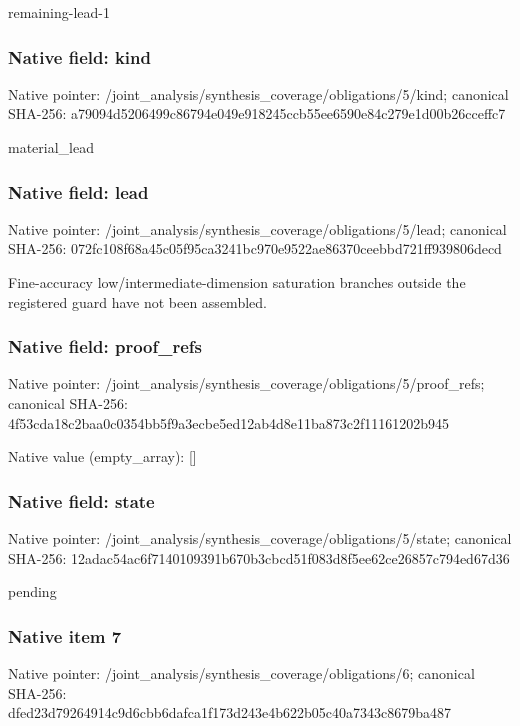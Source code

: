 \documentclass[10pt,a4paper]{article}
\begin{document}
\begingroup\raggedright\sloppy remaining-lead-1\par\endgroup

\subsubsection{Native field: kind}
Native pointer: /joint\_\allowbreak{}analysis/synthesis\_\allowbreak{}coverage/obligations/5/kind; canonical SHA-256: a79094d5206499c86794e049e918245ccb55ee6590e84c279e1d00b26cceffc7

\begingroup\raggedright\sloppy material\_\allowbreak{}lead\par\endgroup

\subsubsection{Native field: lead}
Native pointer: /joint\_\allowbreak{}analysis/synthesis\_\allowbreak{}coverage/obligations/5/lead; canonical SHA-256: 072fc108f68a45c05f95ca3241bc970e9522ae86370ceebbd721ff939806decd

\begingroup\raggedright\sloppy Fine-accuracy low/\allowbreak{}intermediate-dimension saturation branches outside the registered guard have not been assembled.\par\endgroup

\subsubsection{Native field: proof\_\allowbreak{}refs}
Native pointer: /joint\_\allowbreak{}analysis/synthesis\_\allowbreak{}coverage/obligations/5/proof\_\allowbreak{}refs; canonical SHA-256: 4f53cda18c2baa0c0354bb5f9a3ecbe5ed12ab4d8e11ba873c2f11161202b945

Native value (empty\_\allowbreak{}array): []

\subsubsection{Native field: state}
Native pointer: /joint\_\allowbreak{}analysis/synthesis\_\allowbreak{}coverage/obligations/5/state; canonical SHA-256: 12adac54ac6f7140109391b670b3cbcd51f083d8f5ee62ce26857c794ed67d36

\begingroup\raggedright\sloppy pending\par\endgroup

\subsubsection{Native item 7}
Native pointer: /joint\_\allowbreak{}analysis/synthesis\_\allowbreak{}coverage/obligations/6; canonical SHA-256: dfed23d79264914c9d6cbb6dafca1f173d243e4b622b05c40a7343c8679ba487
\end{document}

